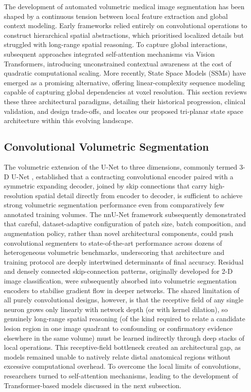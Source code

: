 \documentclass[pdflatex,sn-mathphys-num]{sn-jnl}
\begin{document}
The development of automated volumetric medical image segmentation has been shaped by a continuous tension between local feature extraction and global context modeling. Early frameworks relied entirely on convolutional operations to construct hierarchical spatial abstractions, which prioritised localized details but struggled with long-range spatial reasoning. To capture global interactions, subsequent approaches integrated self-attention mechanisms via Vision Transformers, introducing unconstrained contextual awareness at the cost of quadratic computational scaling. More recently, State Space Models (SSMs) have emerged as a promising alternative, offering linear-complexity sequence modeling capable of capturing global dependencies at voxel resolution. This section reviews these three architectural paradigms, detailing their historical progression, clinical validation, and design trade-offs, and locates our proposed tri-planar state space architecture within this evolving landscape.

\subsection{Convolutional Volumetric Segmentation}\label{ssec:cnn}
The volumetric extension of the U-Net \citep{ronneberger2015u} to
three dimensions, commonly termed 3-D U-Net \citep{cciccek20163d},
established that a contracting convolutional encoder paired with a
symmetric expanding decoder, joined by skip connections that carry
high-resolution spatial detail directly from encoder to decoder, is
sufficient to achieve strong volumetric segmentation performance even
from comparatively few annotated training volumes. The nnU-Net
framework \citep{isensee2021nnu} subsequently demonstrated that
careful, dataset-adaptive configuration of patch size, batch
composition, and augmentation policy, rather than novel
architectural components, could push convolutional segmenters to
state-of-the-art performance across dozens of heterogeneous
volumetric benchmarks, underscoring that architecture and training
protocol are deeply intertwined determinants of final accuracy.
Residual \citep{he2016deep} and densely connected
\citep{huang2017densely} skip-connection patterns, originally
developed for 2-D image classification, were subsequently absorbed
into volumetric segmentation encoders to stabilise gradient flow in
deeper networks. The shared limitation of all purely convolutional
designs, however, is that the receptive field of any single neuron
grows only linearly with network depth (or with kernel dilation),
so genuinely long-range spatial reasoning (of the kind required to
relate a candidate lesion region in one image quadrant to confounding
or confirmatory evidence elsewhere in the same volume) must be
learned indirectly through deep stacks of local operations. This receptive-field bottleneck created an architectural gap, as models remained unable to natively relate distal anatomical regions without excessive computational overhead. To overcome the local limits of convolutions, researchers turned to self-attention mechanisms, leading to the development of Transformer-based models discussed in the next subsection.
\end{document}
